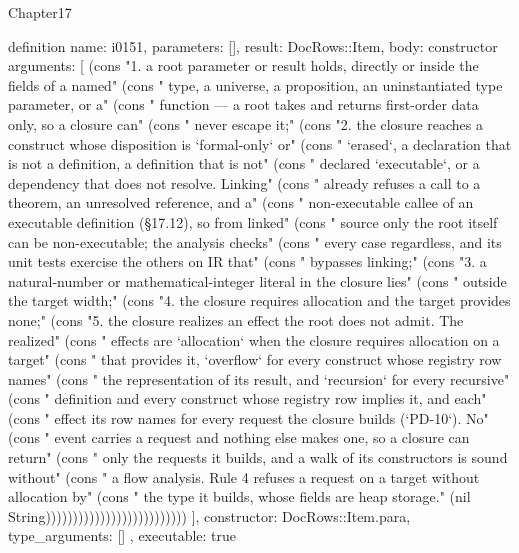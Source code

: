 \begin{lexlean}{Chapter17}
\begin{semanticmodule}
definition{
  name: i0151,
  parameters: [],
  result: DocRows::Item,
  body: constructor{
    arguments: [
      (cons "1. a root parameter or result holds, directly or inside the fields of a named" (cons "   type, a universe, a proposition, an uninstantiated type parameter, or a" (cons "   function — a root takes and returns first-order data only, so a closure can" (cons "   never escape it;" (cons "2. the closure reaches a construct whose disposition is `formal-only` or" (cons "   `erased`, a declaration that is not a definition, a definition that is not" (cons "   declared `executable`, or a dependency that does not resolve. Linking" (cons "   already refuses a call to a theorem, an unresolved reference, and a" (cons "   non-executable callee of an executable definition (§17.12), so from linked" (cons "   source only the root itself can be non-executable; the analysis checks" (cons "   every case regardless, and its unit tests exercise the others on IR that" (cons "   bypasses linking;" (cons "3. a natural-number or mathematical-integer literal in the closure lies" (cons "   outside the target width;" (cons "4. the closure requires allocation and the target provides none;" (cons "5. the closure realizes an effect the root does not admit. The realized" (cons "   effects are `allocation` when the closure requires allocation on a target" (cons "   that provides it, `overflow` for every construct whose registry row names" (cons "   the representation of its result, and `recursion` for every recursive" (cons "   definition and every construct whose registry row implies it, and each" (cons "   effect its row names for every request the closure builds (`PD-10`). No" (cons "   event carries a request and nothing else makes one, so a closure can return" (cons "   only the requests it builds, and a walk of its constructors is sound without" (cons "   a flow analysis. Rule 4 refuses a request on a target without allocation by" (cons "   the type it builds, whose fields are heap storage." (nil String))))))))))))))))))))))))))
    ],
    constructor: DocRows::Item.para,
    type_arguments: []
  },
  executable: true
}


\end{semanticmodule}
\end{lexlean}
